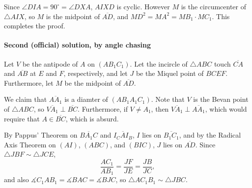 Since $\angle DIA=90^\circ=\angle DXA$, $AIXD$ is cyclic. However $M$ is the circumcenter of $\triangle AIX$, so $M$ is the midpoint of $\overline{AD}$, and $MD^2=MA^2=MB_1\cdot MC_1$. This completes the proof.

\paragraph{Second (official) solution, by angle chasing}     Let $V$ be the antipode of $A$ on $(AB_1C_1)$. Let the incircle of $\triangle ABC$ touch $\overline{CA}$ and $\overline{AB}$ at $E$ and $F$, respectively, and let $J$ be the Miquel point of $BCEF$. Furthermore, let $M$ be the midpoint of $\overline{AD}$.

We claim that $\overline{AA_1}$ is a diamter of $(AB_1A_1C_1)$. Note that $V$ is the Bevan point of $\triangle ABC$, so $\overline{VA_1}\perp\overline{BC}$. Furthermore, if $V\ne A_1$, then $\overline{VA_1}\perp\overline{AA_1}$, which would require that $A\in\overline{BC}$, which is absurd.

By Pappus' Theorem on $\overline{BA_1C}$ and $\overline{I_CAI_B}$, $I$ lies on $\overline{B_1C_1}$, and by the Radical Axis Theorem on $(AI)$, $(ABC)$, and $(BIC)$, $J$ lies on $\overline{AD}$. Since $\triangle JBF\sim\triangle JCE$, \[\frac{AC_1}{AB_1}=\frac{JF}{JE}=\frac{JB}{JC},\]
and also $\measuredangle C_1AB_1=\measuredangle BAC=\measuredangle BJC$, so $\triangle AC_1B_1\sim\triangle JBC$. 


